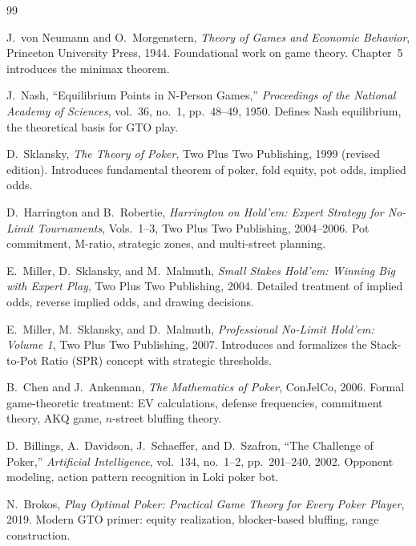 \documentclass[11pt, a4paper]{article}
\theoremstyle{definition}
\begin{document}
\begin{thebibliography}{99}

J.~von Neumann and O.~Morgenstern,
\textit{Theory of Games and Economic Behavior},
Princeton University Press, 1944.
\newblock Foundational work on game theory. Chapter~5 introduces the minimax theorem.

J.~Nash,
``Equilibrium Points in N-Person Games,''
\textit{Proceedings of the National Academy of Sciences}, vol.~36, no.~1, pp.~48--49, 1950.
\newblock Defines Nash equilibrium, the theoretical basis for GTO play.

D.~Sklansky,
\textit{The Theory of Poker},
Two Plus Two Publishing, 1999 (revised edition).
\newblock Introduces fundamental theorem of poker, fold equity, pot odds, implied odds.

D.~Harrington and B.~Robertie,
\textit{Harrington on Hold'em: Expert Strategy for No-Limit Tournaments},
Vols.~1--3, Two Plus Two Publishing, 2004--2006.
\newblock Pot commitment, M-ratio, strategic zones, and multi-street planning.

E.~Miller, D.~Sklansky, and M.~Malmuth,
\textit{Small Stakes Hold'em: Winning Big with Expert Play},
Two Plus Two Publishing, 2004.
\newblock Detailed treatment of implied odds, reverse implied odds, and drawing decisions.

E.~Miller, M.~Sklansky, and D.~Malmuth,
\textit{Professional No-Limit Hold'em: Volume 1},
Two Plus Two Publishing, 2007.
\newblock Introduces and formalizes the Stack-to-Pot Ratio (SPR) concept with strategic thresholds.

B.~Chen and J.~Ankenman,
\textit{The Mathematics of Poker},
ConJelCo, 2006.
\newblock Formal game-theoretic treatment: EV calculations, defense frequencies, commitment theory, AKQ game, $n$-street bluffing theory.

D.~Billings, A.~Davidson, J.~Schaeffer, and D.~Szafron,
``The Challenge of Poker,''
\textit{Artificial Intelligence}, vol.~134, no.~1--2, pp.~201--240, 2002.
\newblock Opponent modeling, action pattern recognition in Loki poker bot.

N.~Brokos,
\textit{Play Optimal Poker: Practical Game Theory for Every Poker Player},
2019.
\newblock Modern GTO primer: equity realization, blocker-based bluffing, range construction.


\end{thebibliography}
\end{document}
